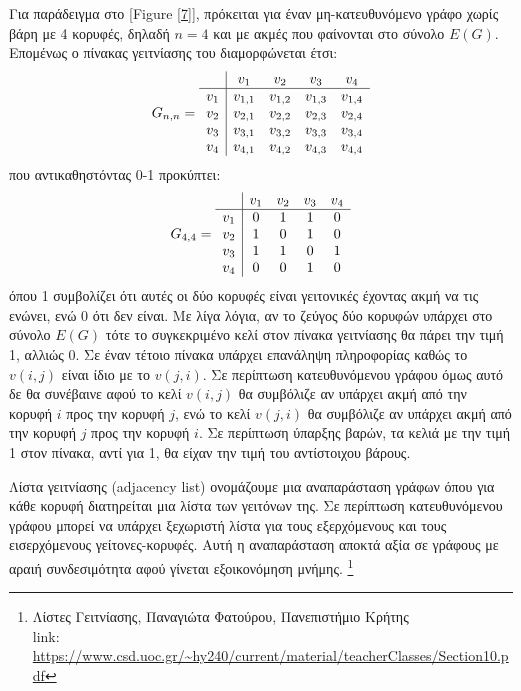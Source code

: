 Για παράδειγμα στο [Figure \ref{7}], πρόκειται για έναν μη-κατευθυνόμενο γράφο χωρίς βάρη με 4 κορυφές, δηλαδή $n=4$ και με ακμές που φαίνονται στο σύνολο $E(G)$. Επομένως ο πίνακας γειτνίασης του διαμορφώνεται έτσι: 
$$
G_{n,n} = 
\begin{array}{c|c c c c}
   & v_{1} & v_{2} & v_{3} & v_{4} \\ \hline
   v_{1} & v_{1,1} & v_{1,2} & v_{1,3} & v_{1,4} \\
   v_{2} & v_{2,1} & v_{2,2} &   v_{2,3} & v_{2,4} \\
   v_{3} & v_{3,1} & v_{3,2} & v_{3,3} & v_{3,4} \\
   v_{4} & v_{4,1} & v_{4,2} & v_{4,3} & v_{4,4} 
\end{array}
$$
που αντικαθηστόντας 0-1 προκύπτει: 
$$
G_{4,4} = 
\begin{array}{c|c c c c}
   & v_{1} & v_{2} & v_{3} & v_{4} \\ \hline
   v_{1} & 0 & 1 & 1 & 0 \\
   v_{2} & 1 & 0 & 1 & 0 \\
   v_{3} & 1 & 1 & 0 & 1 \\
   v_{4} & 0 & 0 & 1 & 0 
\end{array}
$$
όπου 1 συμβολίζει ότι αυτές οι δύο κορυφές είναι γειτονικές έχοντας ακμή να τις ενώνει, ενώ 0 ότι δεν είναι. Με λίγα λόγια, αν το ζεύγος δύο κορυφών υπάρχει στο σύνολο $E(G)$ τότε το συγκεκριμένο κελί στον πίνακα γειτνίασης θα πάρει την τιμή 1, αλλιώς 0. Σε έναν τέτοιο πίνακα υπάρχει επανάληψη πληροφορίας καθώς το $v(i,j)$ είναι ίδιο με το $v(j,i)$. Σε περίπτωση κατευθυνόμενου γράφου όμως αυτό δε θα συνέβαινε αφού το κελί $v(i,j)$ θα συμβόλιζε αν υπάρχει ακμή από την κορυφή $i$ προς την κορυφή $j$, ενώ το κελί $v(j,i)$ θα συμβόλιζε αν υπάρχει ακμή από την κορυφή $j$ προς την κορυφή $i$. Σε περίπτωση ύπαρξης βαρών, τα κελιά με την τιμή 1 στον πίνακα, αντί για 1, θα είχαν την τιμή του αντίστοιχου βάρους. 

Λίστα γειτνίασης (adjacency list) ονομάζουμε μια αναπαράσταση γράφων όπου για κάθε κορυφή διατηρείται μια λίστα των γειτόνων της. Σε περίπτωση κατευθυνόμενου γράφου μπορεί να υπάρχει ξεχωριστή λίστα για τους εξερχόμενους και τους εισερχόμενους γείτονες-κορυφές. Αυτή η αναπαράσταση αποκτά αξία σε γράφους με αραιή συνδεσιμότητα αφού γίνεται εξοικονόμηση μνήμης. \footnote{Λίστες Γειτνίασης, Παναγιώτα Φατούρου, Πανεπιστήμιο Κρήτης \\link: \url{https://www.csd.uoc.gr/~hy240/current/material/teacherClasses/Section10.pdf}}

